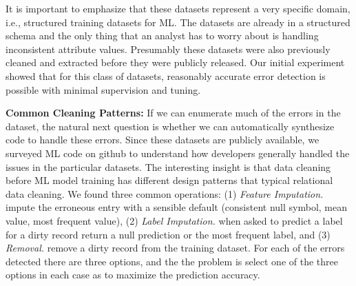It is important to emphasize that these datasets represent a very specific domain, i.e., structured training datasets for ML.
The datasets are already in a structured schema and the only thing that an analyst has to worry about is handling inconsistent attribute values.
Presumably these datasets were also previously cleaned and extracted before they were publicly released.
Our initial experiment showed that for this class of datasets, reasonably accurate error detection is possible with minimal supervision and tuning.

\vspace{0.5em}
\noindent\textbf{Common Cleaning Patterns: }  If we can enumerate much of the errors in the dataset, the natural next question is whether we can automatically synthesize code to handle these errors. Since these datasets are publicly available, we surveyed ML code on github to understand how developers generally handled the issues in the particular datasets. The interesting insight is that data cleaning before ML model training has different design patterns that typical relational data cleaning. We found three common operations: (1) \emph{Feature Imputation. } impute the erroneous entry with a sensible default (consistent null symbol, mean value, most frequent value),  (2) \emph{Label Imputation. } when asked to predict a label for a dirty record return a null prediction or the most frequent label, and (3) \emph{Removal. } remove a dirty record from the training dataset. For each of the errors detected there are three options, and the the problem is select one of the three options in each case as to maximize the prediction accuracy.
\fi